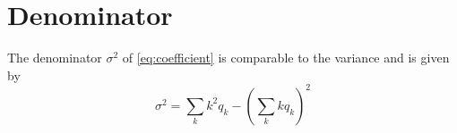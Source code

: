 \section{Denominator}

The denominator $\sigma^2$ of \cref{eq:coefficient} is comparable to the variance and is given by
\[
    \sigma^2 = \sum_{k} k^2 q_k - \left(\sum_{k} k q_k\right)^2
    \tag{7.12} \label{eq:variance}
\]
